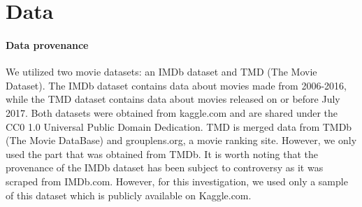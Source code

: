 \section{Data}

    \paragraph{Data provenance}
        We utilized two movie datasets: an IMDb dataset\cite{data:IMDb} and
            TMD\cite{data:TMD} (The Movie Dataset).
        The IMDb dataset contains data about movies made from 2006-2016, while the TMD
            dataset contains data about movies released on or before July 2017.
        Both datasets were obtained from kaggle.com and are shared under the CC0 1.0
            Universal Public Domain Dedication.
        TMD is merged data from TMDb (The Movie DataBase) and grouplens.org, a movie
            ranking site.
        However, we only used the part that was obtained from TMDb.
        It is worth noting that the provenance of the IMDb dataset has been subject to
            controversy as it was scraped from IMDb.com.
        However, for this investigation, we used only a sample of this dataset which is
            publicly available on Kaggle.com.

